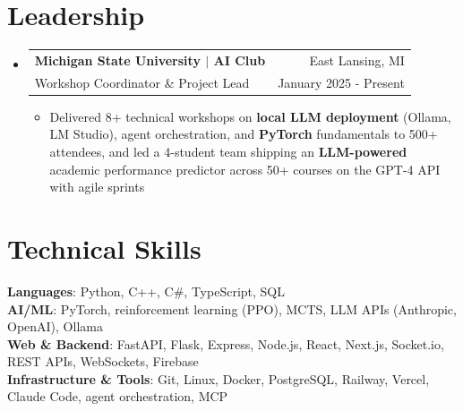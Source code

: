 \documentclass[letterpaper,11pt]{article}
\makeatletter
\newcommand{\resumeItem}[1]{
  \item\small{
    {#1 \vspace{-2pt}}
  }
}
\newcommand{\resumeSubheading}[4]{
  \vspace{-2pt}\item
    \begin{tabular*}{0.97\textwidth}[t]{l@{\extracolsep{\fill}}r}
      \textbf{#1} & \small #2 \\
      \small#3 & \small #4 \\
    \end{tabular*}\vspace{-7pt}
}
\newcommand{\resumeSubHeadingListStart}{\begin{itemize}[leftmargin=0.15in, label={}]}
\newcommand{\resumeSubHeadingListEnd}{\end{itemize}}
\newcommand{\resumeItemListStart}{\begin{itemize}}
\newcommand{\resumeItemListEnd}{\end{itemize}\vspace{-5pt}}
\makeatother
\begin{document}
\section{Leadership}
  \resumeSubHeadingListStart
    \resumeSubheading
      {Michigan State University $|$ AI Club}{East Lansing, MI}
      {Workshop Coordinator \& Project Lead}{January 2025 - Present}
      \resumeItemListStart
        \resumeItem{Delivered 8+ technical workshops on \textbf{local LLM deployment} (Ollama, LM Studio), agent orchestration, and \textbf{PyTorch} fundamentals to 500+ attendees, and led a 4-student team shipping an \textbf{LLM-powered} academic performance predictor across 50+ courses on the GPT-4 API with agile sprints}
      \resumeItemListEnd
  \resumeSubHeadingListEnd

\section{Technical Skills}
 \begin{itemize}[leftmargin=0.15in, label={}]
    \small{\item{
     \textbf{Languages}{: Python, C++, C\#, TypeScript, SQL} \\
     \textbf{AI/ML}{: PyTorch, reinforcement learning (PPO), MCTS, LLM APIs (Anthropic, OpenAI), Ollama} \\
     \textbf{Web \& Backend}{: FastAPI, Flask, Express, Node.js, React, Next.js, Socket.io, REST APIs, WebSockets, Firebase} \\
     \textbf{Infrastructure \& Tools}{: Git, Linux, Docker, PostgreSQL, Railway, Vercel, Claude Code, agent orchestration, MCP}
    }}
 \end{itemize}
\end{document}

